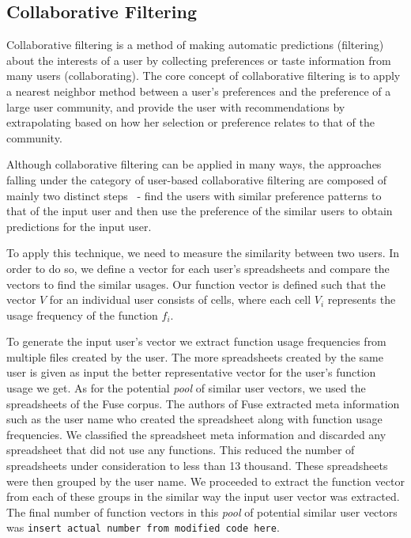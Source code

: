 \documentclass[conference]{IEEEtran}
\begin{document}
\subsection{Collaborative Filtering}
Collaborative filtering is a method of making automatic predictions (filtering) about the interests of a user by collecting preferences or taste information from many users (collaborating). The core concept of collaborative filtering is to apply a nearest neighbor method between a user's preferences and the preference of a large user community, and provide the user with recommendations by extrapolating based on how her selection or preference relates to that of the community.

Although collaborative filtering can be applied in many ways, the approaches falling under the category of user-based collaborative filtering are composed of mainly two distinct steps~\cite{breese1998empirical} - find the users with similar preference patterns to that of the input user and then use the preference of the similar users to obtain predictions for the input user.

To apply this technique, we need to measure the similarity between two users. In order to do so, we define a vector for each user's spreadsheets and compare the vectors to find the similar usages. Our function vector is defined such that the vector $V$ for an individual user consists of cells, where each cell $V_i$ represents the usage frequency of the function $f_i$.

To generate the input user's vector we extract function usage frequencies from multiple files created by the user. The more spreadsheets created by the same user is given as input the better representative vector for the user's function usage we get. As for the potential \textit{pool} of similar user vectors, we used the spreadsheets of the Fuse corpus. The authors of Fuse extracted meta information such as the user name who created the spreadsheet along with function usage frequencies. We classified the spreadsheet meta information and discarded any spreadsheet that did not use any functions. This reduced the number of spreadsheets under consideration to less than 13 thousand. These spreadsheets were then grouped by the user name. We proceeded to extract the function vector from each of these groups in the similar way the input user vector was extracted. The final number of function vectors in this \textit{pool} of potential similar user vectors was \texttt{insert actual number from modified code here}.
\end{document}

